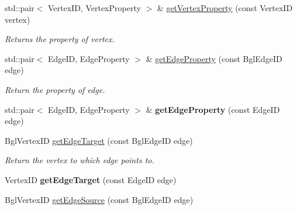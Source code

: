 \begin{DoxyCompactItemize}
\item 
\hypertarget{classgraybat_1_1graphPolicy_1_1BGL_a73b7e073fda7a9e21c5f420e984ba618}{}std\+::pair$<$ Vertex\+I\+D, Vertex\+Property $>$ \& \hyperlink{classgraybat_1_1graphPolicy_1_1BGL_a73b7e073fda7a9e21c5f420e984ba618}{get\+Vertex\+Property} (const Vertex\+I\+D vertex)\label{classgraybat_1_1graphPolicy_1_1BGL_a73b7e073fda7a9e21c5f420e984ba618}

\begin{DoxyCompactList}\small\item\em Returns the property of {\itshape vertex}. \end{DoxyCompactList}\item 
\hypertarget{classgraybat_1_1graphPolicy_1_1BGL_ad628ab3bb283a87337bb5d1da4e6c31b}{}std\+::pair$<$ Edge\+I\+D, Edge\+Property $>$ \& \hyperlink{classgraybat_1_1graphPolicy_1_1BGL_ad628ab3bb283a87337bb5d1da4e6c31b}{get\+Edge\+Property} (const Bgl\+Edge\+I\+D edge)\label{classgraybat_1_1graphPolicy_1_1BGL_ad628ab3bb283a87337bb5d1da4e6c31b}

\begin{DoxyCompactList}\small\item\em Return the property of {\itshape edge}. \end{DoxyCompactList}\item 
\hypertarget{classgraybat_1_1graphPolicy_1_1BGL_ab50e44a641bb3e0e3d2f2778419e78c5}{}std\+::pair$<$ Edge\+I\+D, Edge\+Property $>$ \& {\bfseries get\+Edge\+Property} (const Edge\+I\+D edge)\label{classgraybat_1_1graphPolicy_1_1BGL_ab50e44a641bb3e0e3d2f2778419e78c5}

\item 
\hypertarget{classgraybat_1_1graphPolicy_1_1BGL_ac54da8279752a79998ae35fbf64c8338}{}Bgl\+Vertex\+I\+D \hyperlink{classgraybat_1_1graphPolicy_1_1BGL_ac54da8279752a79998ae35fbf64c8338}{get\+Edge\+Target} (const Bgl\+Edge\+I\+D edge)\label{classgraybat_1_1graphPolicy_1_1BGL_ac54da8279752a79998ae35fbf64c8338}

\begin{DoxyCompactList}\small\item\em Return the vertex to which {\itshape edge} points to. \end{DoxyCompactList}\item 
\hypertarget{classgraybat_1_1graphPolicy_1_1BGL_a47913c1d620cfa54b3c8ca52331e8a1f}{}Vertex\+I\+D {\bfseries get\+Edge\+Target} (const Edge\+I\+D edge)\label{classgraybat_1_1graphPolicy_1_1BGL_a47913c1d620cfa54b3c8ca52331e8a1f}

\item 
\hypertarget{classgraybat_1_1graphPolicy_1_1BGL_a2732a7037a0108afda5c7a5c1d51b9c3}{}Bgl\+Vertex\+I\+D \hyperlink{classgraybat_1_1graphPolicy_1_1BGL_a2732a7037a0108afda5c7a5c1d51b9c3}{get\+Edge\+Source} (const Bgl\+Edge\+I\+D edge)\label{classgraybat_1_1graphPolicy_1_1BGL_a2732a7037a0108afda5c7a5c1d51b9c3}


\end{DoxyCompactItemize}
